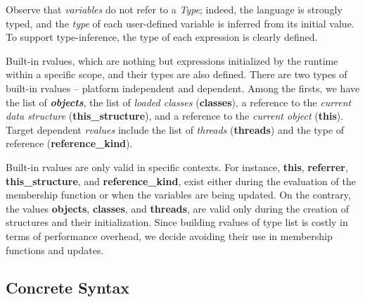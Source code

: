 Observe that \textit{variables} do not refer to a \textit{Type}; indeed, the language is  strongly typed, and the \textit{type} of each user-defined variable is inferred from its initial value.
To support type-inference, the type of each expression is clearly defined.

Built-in rvalues, which are nothing but expressions initialized by the runtime within a specific scope, and their types are also defined.
There are two types of built-in rvalues -- platform independent and dependent.
Among the firsts, we have the list of  \textit{\textbf{objects}}, the list of \textit{loaded classes} (\textbf{classes}), a reference to the \textit{current data structure} (\textbf{this\_structure}), and a reference to the \textit{current object} (\textbf{this}).
Target dependent \textit{rvalues} include the list of \textit{threads} (\textbf{threads}) and the type of reference (\textbf{reference\_kind}).

Built-in rvalues are only valid in specific contexts.
For instance, \textbf{this}, \textbf{referrer}, \textbf{this\_structure}, and \textbf{reference\_kind}, exist either during the evaluation of the membership function or when the variables are being updated.
On the contrary, the values \textbf{objects}, \textbf{classes}, and \textbf{threads}, are valid only during the creation of structures and their initialization.
Since building rvalues of type list is costly in terms of performance overhead, we decide avoiding their use in membership functions and updates. 
 



\subsection{Concrete Syntax}\label{sec:concrete-syntax}

